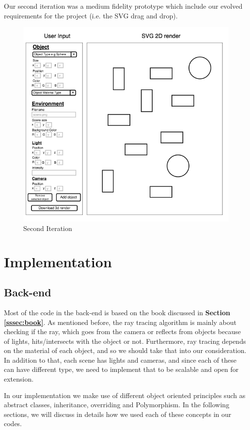 \documentclass[a4paper]{report}
\begin{document}
	Our second iteration was a medium fidelity prototype which include our evolved requirements for the project (i.e. the SVG drag and drop).
	\begin{figure}[ht!]
		\centering
		\includegraphics[width=1\textwidth]{second_prototype.png}
		\caption{Second Iteration}
		\label{fig:secondIt}
	\end{figure}
	
	\chapter{Implementation}
	
	\label{ch:imp}\section{Back-end}
	Most of the code in the back-end is based on the book discussed in \textbf{Section \ref{sssec:book}}. As mentioned before, the ray tracing algorithm is mainly about checking if the ray, which goes from the camera or reflects from objects because of lights, hits/intersects with the object or not. Furthermore, ray tracing depends on the material of each object, and so we should take that into our consideration. In addition to that, each scene has lights and cameras, and since each of these can have different type, we need to implement that to be scalable and open for extension.\\
	\par In our implementation we make use of different object oriented principles such as abstract classes, inheritance, overriding and Polymorphism. In the following sections, we will discuss in details how we used each of these concepts in our codes.
\end{document}
